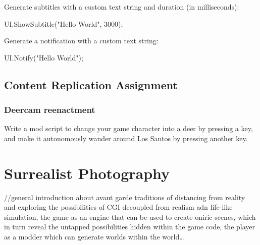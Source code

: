 \documentclass[
  openany]{book}
\newenvironment{Shaded}{\begin{snugshade}}{\end{snugshade}}
\newcommand{\DecValTok}[1]{\textcolor[rgb]{0.00,0.00,0.81}{#1}}
\newcommand{\FunctionTok}[1]{\textcolor[rgb]{0.00,0.00,0.00}{#1}}
\newcommand{\NormalTok}[1]{#1}
\newcommand{\StringTok}[1]{\textcolor[rgb]{0.31,0.60,0.02}{#1}}
\begin{document}
Generate subtitles with a custom text string and duration (in milliseconds):

\begin{Shaded}
\begin{Highlighting}[]
\NormalTok{UI.}\FunctionTok{ShowSubtitle}\NormalTok{(}\StringTok{"Hello World"}\NormalTok{, }\DecValTok{3000}\NormalTok{);}
\end{Highlighting}
\end{Shaded}

Generate a notification with a custom text string:

\begin{Shaded}
\begin{Highlighting}[]
\NormalTok{UI.}\FunctionTok{Notify}\NormalTok{(}\StringTok{"Hello World"}\NormalTok{);}
\end{Highlighting}
\end{Shaded}

\hypertarget{content-replication-assignment-3}{%
\section*{Content Replication Assignment}\label{content-replication-assignment-3}}

\hypertarget{deercam-reenactment}{%
\subsection*{Deercam reenactment}\label{deercam-reenactment}}

Write a mod script to change your game character into a deer by pressing a key, and make it autonomously wander around Los Santos by pressing another key.

\hypertarget{surrealist-photography}{%
\chapter{Surrealist Photography}\label{surrealist-photography}}

//general introduction about avant garde traditions of distancing from reality and exploring the possibilities of CGI decoupled from realism adn life-like simulation, the game as an engine that can be used to create oniric scenes, which in turn reveal the untapped possibilities hidden within the game code, the player as a modder which can generate worlds within the world\ldots{}
\end{document}

